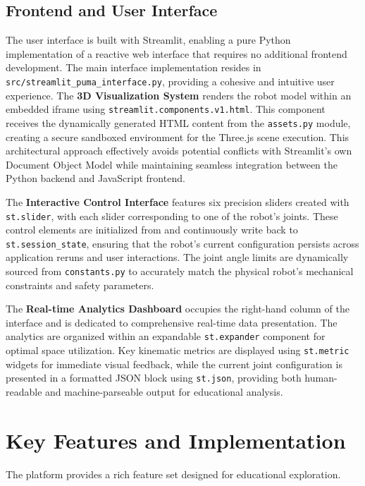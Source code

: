 \documentclass[conference]{IEEEtran}
\begin{document}
\subsection{Frontend and User Interface}
The user interface is built with Streamlit, enabling a pure Python implementation of a reactive web interface that requires no additional frontend development. The main interface implementation resides in \texttt{src/streamlit\_puma\_interface.py}, providing a cohesive and intuitive user experience.
The \textbf{3D Visualization System} renders the robot model within an embedded iframe using \texttt{streamlit.components.v1.html}. This component receives the dynamically generated HTML content from the \texttt{assets.py} module, creating a secure sandboxed environment for the Three.js scene execution. This architectural approach effectively avoids potential conflicts with Streamlit's own Document Object Model while maintaining seamless integration between the Python backend and JavaScript frontend.

The \textbf{Interactive Control Interface} features six precision sliders created with \texttt{st.slider}, with each slider corresponding to one of the robot's joints. These control elements are initialized from and continuously write back to \texttt{st.session\_state}, ensuring that the robot's current configuration persists across application reruns and user interactions. The joint angle limits are dynamically sourced from \texttt{constants.py} to accurately match the physical robot's mechanical constraints and safety parameters.

The \textbf{Real-time Analytics Dashboard} occupies the right-hand column of the interface and is dedicated to comprehensive real-time data presentation. The analytics are organized within an expandable \texttt{st.expander} component for optimal space utilization. Key kinematic metrics are displayed using \texttt{st.metric} widgets for immediate visual feedback, while the current joint configuration is presented in a formatted JSON block using \texttt{st.json}, providing both human-readable and machine-parseable output for educational analysis.

\section{Key Features and Implementation}
The platform provides a rich feature set designed for educational exploration.
\end{document}
